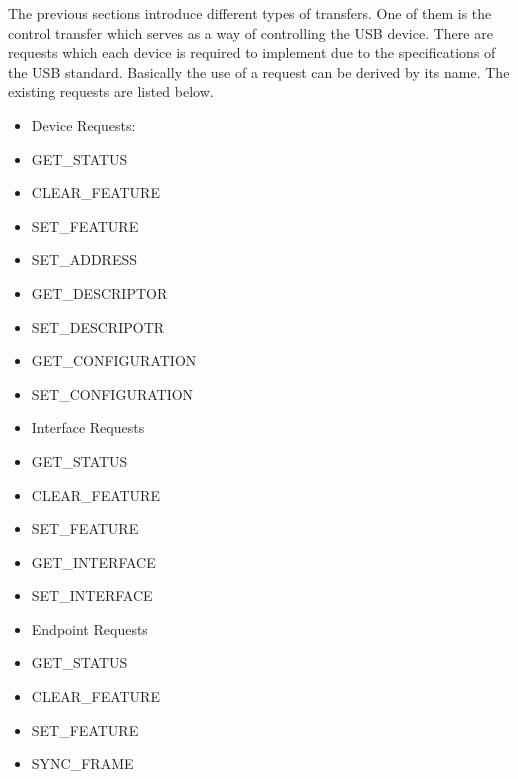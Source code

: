 {The previous sections introduce different types of transfers. One of
them is the control transfer which serves as a way of controlling the
USB device. There are requests which each device is required to
implement due to the specifications of the USB standard. Basically the
use of a request can be derived by its name. The existing requests are
listed below.}

\begin{itemize}
\tightlist
\item
  {Device Requests:}
\end{itemize}

\begin{itemize}
\tightlist
\item
  {GET\_STATUS}
\item
  {CLEAR\_FEATURE}
\item
  {SET\_FEATURE}
\item
  {SET\_ADDRESS}
\item
  {GET\_DESCRIPTOR}
\item
  {SET\_DESCRIPOTR}
\item
  {GET\_CONFIGURATION}
\item
  {SET\_CONFIGURATION}
\end{itemize}

{}

\begin{itemize}
\tightlist
\item
  {Interface Requests}
\end{itemize}

\begin{itemize}
\tightlist
\item
  {GET\_STATUS}
\item
  {CLEAR\_FEATURE}
\item
  {SET\_FEATURE}
\item
  {GET\_INTERFACE}
\item
  {SET\_INTERFACE}
\end{itemize}

{}

\begin{itemize}
\tightlist
\item
  {Endpoint Requests}
\end{itemize}

\begin{itemize}
\tightlist
\item
  {GET\_STATUS}
\item
  {CLEAR\_FEATURE}
\item
  {SET\_FEATURE}
\item
  {SYNC\_FRAME}
\end{itemize}

